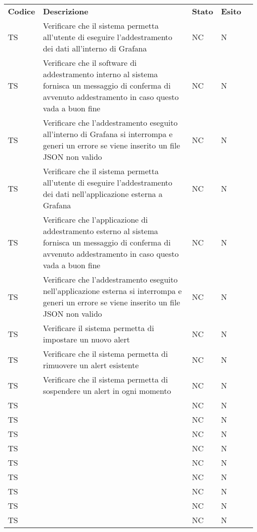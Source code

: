 \begin{longtable} {
		>{\centering}p{15mm} 
		>{\centering}p{79.5mm}
		>{\centering}p{15mm} 
		>{\centering}p{15mm}
		>{}p{0mm}}
	\rowcolor{gray!50}
	\textbf{Codice} & \textbf{Descrizione} & \textbf{Stato} & \textbf{Esito} &\TBstrut \\
	TS & Verificare che il sistema permetta all'utente di eseguire l'addestramento dei dati all'interno di Grafana & NC & N  &\TBstrut \\ [2mm]
	TS & Verificare che il software di addestramento interno al sistema fornisca un messaggio di conferma di avvenuto addestramento in caso questo vada a buon fine & NC & N  &\TBstrut \\ [2mm]
	TS & Verificare che l'addestramento eseguito all'interno di Grafana si interrompa e generi un errore se viene inserito un file JSON non valido & NC & N  &\TBstrut \\ [2mm]
	TS & Verificare che il sistema permetta all'utente di eseguire l'addestramento dei dati nell'applicazione esterna a Grafana & NC & N  &\TBstrut \\ [2mm]
	TS & Verificare che l'applicazione di addestramento esterno al sistema fornisca un messaggio di conferma di avvenuto addestramento in caso questo vada a buon fine & NC & N  &\TBstrut \\ [2mm]
	TS & Verificare che l'addestramento eseguito nell'applicazione esterna si interrompa e generi un errore se viene inserito un file JSON non valido & NC & N  &\TBstrut \\ [2mm]
	TS & Verificare il sistema permetta di impostare un nuovo alert & NC & N  &\TBstrut \\ [2mm]
	TS & Verificare che il sistema permetta di rimuovere un alert esistente & NC & N  &\TBstrut \\ [2mm]
	TS & Verificare che il sistema permetta di sospendere un alert in ogni momento & NC & N  &\TBstrut \\ [2mm]
	TS &  & NC & N  &\TBstrut \\ [2mm]
	TS &  & NC & N  &\TBstrut \\ [2mm]
	TS &  & NC & N  &\TBstrut \\ [2mm]
	TS &  & NC & N  &\TBstrut \\ [2mm]
	TS &  & NC & N  &\TBstrut \\ [2mm]
	TS &  & NC & N  &\TBstrut \\ [2mm]
	TS &  & NC & N  &\TBstrut \\ [2mm]
	TS &  & NC & N  &\TBstrut \\ [2mm]
	TS &  & NC & N  &\TBstrut \\ [2mm]	
\end{longtable}


